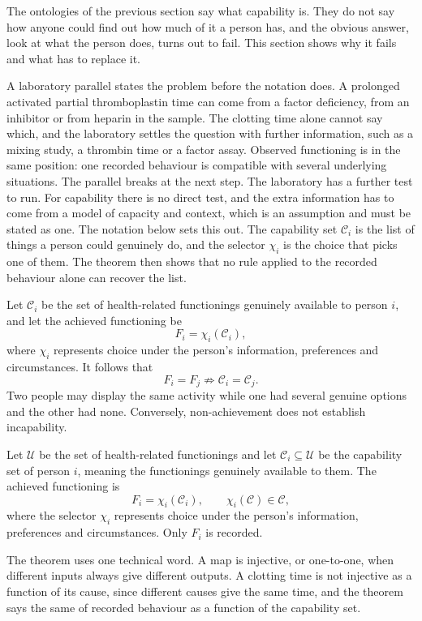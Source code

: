 The ontologies of the previous section say what capability is. They do not say how anyone could find out how much of it a person has, and the obvious answer, look at what the person does, turns out to fail. This section shows why it fails and what has to replace it.

A laboratory parallel states the problem before the notation does. A prolonged activated partial thromboplastin time can come from a factor deficiency, from an inhibitor or from heparin in the sample. The clotting time alone cannot say which, and the laboratory settles the question with further information, such as a mixing study, a thrombin time or a factor assay. Observed functioning is in the same position: one recorded behaviour is compatible with several underlying situations. The parallel breaks at the next step. The laboratory has a further test to run. For capability there is no direct test, and the extra information has to come from a model of capacity and context, which is an assumption and must be stated as one. The notation below sets this out. The capability set $\mathcal C_i$ is the list of things a person could genuinely do, and the selector $\chi_i$ is the choice that picks one of them. The theorem then shows that no rule applied to the recorded behaviour alone can recover the list.

Let $\mathcal C_i$ be the set of health-related functionings genuinely
available to person $i$, and let the achieved functioning be
\[
F_i=\chi_i(\mathcal C_i),
\]
where $\chi_i$ represents choice under the person's information, preferences
and circumstances. It follows that
\[
F_i=F_j\not\Rightarrow\mathcal C_i=\mathcal C_j.
\]
Two people may display the same activity while one had several genuine options
and the other had none. Conversely, non-achievement does not establish
incapability.

\begin{definition}
\label{def:lit-choicemap}
Let $\mathcal U$ be the set of health-related functionings and let
$\mathcal C_i\subseteq\mathcal U$ be the capability set of person $i$, meaning
the functionings genuinely available to them. The achieved functioning is
\[
  F_i=\chi_i(\mathcal C_i),\qquad \chi_i(\mathcal C)\in\mathcal C ,
\]
where the selector $\chi_i$ represents choice under the person's information,
preferences and circumstances. Only $F_i$ is recorded.
\end{definition}

The theorem uses one technical word. A map is injective, or one-to-one, when different inputs always give different outputs. A clotting time is not injective as a function of its cause, since different causes give the same time, and the theorem says the same of recorded behaviour as a function of the capability set.


